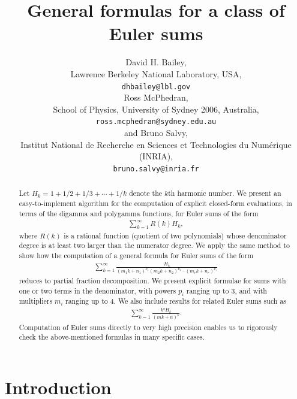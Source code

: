 \documentclass{article}
\theoremstyle{definition}
\begin{document}
\title
{General formulas for a class of Euler sums}
\author{David H. Bailey,\\
Lawrence Berkeley National Laboratory, USA, \\
{\tt dhbailey@lbl.gov} \\
Ross McPhedran,\\
School of Physics, University of Sydney 2006, Australia,\\
{\tt ross.mcphedran@sydney.edu.au} \\
and Bruno Salvy, \\
Institut National de Recherche en Sciences et Technologies du Numérique (INRIA), \\
{\tt bruno.salvy@inria.fr}}
\maketitle

\begin{abstract}
Let $H_k = 1 + 1/2 + 1/3 + \cdots + 1/k$ denote the $k$th harmonic number. We present an easy-to-implement algorithm for the computation of explicit closed-form evaluations, in terms of the digamma and polygamma functions, for Euler sums of the form 
\begin{align}
\sum_{k=1}^\infty R(k) H_k,
\end{align}
where $R(k)$ is a rational function (quotient of two polynomials) whose denominator degree is at least two larger than the numerator degree. We apply the same method to show how the computation of a general formula for Euler sums of the form
\begin{align*}
\sum_{k=1}^\infty \frac{H_k}{(m_1 k + n_1)^{p_1} (m_2 k + n_2)^{p_2} \cdots (m_r k + n_r)^{p_r}}
\end{align*}
reduces to partial fraction decomposition. We present explicit formulae for sums with one or two terms in the denominator, with powers $p_i$ ranging up to 3, and with multipliers $m_i$ ranging up to 4. We also include results for related Euler sums such as 
\begin{align*}
\sum_{k=1}^\infty \frac{k^q H_k}{(m k + n)^p}.
\end{align*}
Computation of Euler sums directly to very high precision enables us to rigorously check the above-mentioned formulas in many specific cases. 
\end{abstract}

\section{Introduction}
\end{document}
